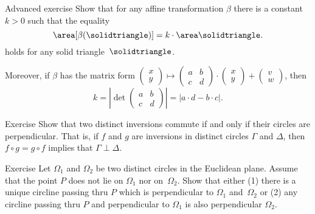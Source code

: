 \begin{thm}{Advanced exercise}\label{ex:area-affine}
Show that for any affine transformation $\beta$ there is a constant $k>0$
such that the equality 
\[\area[\beta(\solidtriangle)]=k\cdot\area\solidtriangle.\]
holds for any solid triangle~$\solidtriangle$.

Moreover, if $\beta$ has the matrix form $\left(\begin{smallmatrix}
x\\ y
\end{smallmatrix} \right)
  \mapsto
  \left(\begin{smallmatrix}
a&b\\ c&d
\end{smallmatrix} \right)
  \cdot
  \left(\begin{smallmatrix}
x\\ y
\end{smallmatrix} \right)
  +
\left(\begin{smallmatrix}
v\\ w
\end{smallmatrix} \right)$,
then 
\[k=|\det\left(\begin{smallmatrix}
a&b\\ c&d
\end{smallmatrix} \right)|=|a\cdot d-b\cdot c|.\]

\end{thm}

















\begin{thm}{Exercise}\label{ex:commuting inversions}
Show that two distinct inversions commute if and only if their circles are perpendicular.
That is, if $f$ and $g$ are inversions in distinct circles $\Gamma$ and $\Delta$, then 
$f\circ g=g\circ f$ implies that $\Gamma\perp\Delta$.
\end{thm}











\begin{thm}{Exercise}\label{ex:cline-perp-to-two}
Let $\Omega_1$ and $\Omega_2$ be two distinct circles in the Euclidean plane.
Assume that the point $P$ does not lie on $\Omega_1$ nor on~$\Omega_2$.
Show that either (1) there is a unique circline passing thru $P$ which is perpendicular to $\Omega_1$ and~$\Omega_2$ or (2) any circline passing thru $P$ and perpendicular to $\Omega_1$ is also perpendicular $\Omega_2$.
\end{thm}


